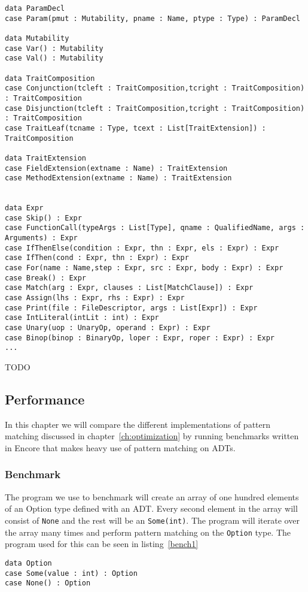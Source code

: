 \documentclass[10pt]{report}
\def\code#1{\texttt{#1}} %
\begin{document}
{\begin{lstlisting}[language=encore,caption={Abstract Syntax Tree with ADTs},label=AST]
data ParamDecl
case Param(pmut : Mutability, pname : Name, ptype : Type) : ParamDecl

data Mutability
case Var() : Mutability
case Val() : Mutability

data TraitComposition
case Conjunction(tcleft : TraitComposition,tcright : TraitComposition) : TraitComposition
case Disjunction(tcleft : TraitComposition,tcright : TraitComposition) : TraitComposition
case TraitLeaf(tcname : Type, tcext : List[TraitExtension]) : TraitComposition

data TraitExtension
case FieldExtension(extname : Name) : TraitExtension
case MethodExtension(extname : Name) : TraitExtension


data Expr
case Skip() : Expr
case FunctionCall(typeArgs : List[Type], qname : QualifiedName, args : Arguments) : Expr
case IfThenElse(condition : Expr, thn : Expr, els : Expr) : Expr
case IfThen(cond : Expr, thn : Expr) : Expr
case For(name : Name,step : Expr, src : Expr, body : Expr) : Expr
case Break() : Expr
case Match(arg : Expr, clauses : List[MatchClause]) : Expr
case Assign(lhs : Expr, rhs : Expr) : Expr
case Print(file : FileDescriptor, args : List[Expr]) : Expr
case IntLiteral(intLit : int) : Expr
case Unary(uop : UnaryOp, operand : Expr) : Expr
case Binop(binop : BinaryOp, loper : Expr, roper : Expr) : Expr
...
\end{lstlisting}
TODO
\subsection{Performance}
\par{In this chapter we will compare the different implementations of pattern matching discussed in chapter~\ref{ch:optimization} by running benchmarks written in Encore that makes heavy use of pattern matching on ADTs.}
\subsubsection{Benchmark}
\par{The program we use to benchmark will create an array of one hundred elements of an Option type defined with an ADT. Every second element in the array will consist of \code{None} and the rest will be an \code{Some(int)}. The program will iterate over the array many times and perform pattern matching on the \code{Option} type. The program used for this can be seen in listing~\ref{bench1}}

\begin{lstlisting}[language=encore,caption={Program used for benchmarking},label=AST]
data Option
case Some(value : int) : Option
case None() : Option


\end{lstlisting}}
\end{document}
